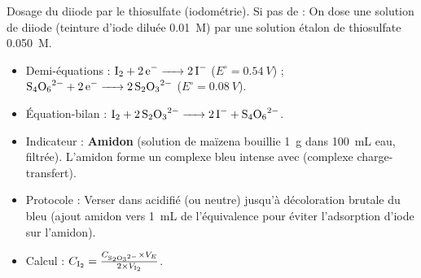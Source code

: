 \documentclass[11pt]{article}
\begin{document}
\begin{exoresolu}
Dosage du diiode par le thiosulfate (iodométrie).
\tcblower
Si pas de  : On dose une solution de diiode  (teinture d'iode diluée \SI{0,01}{M}) par une solution étalon de thiosulfate  \SI{0,050}{M}.
\begin{itemize}
    \item Demi-équations : $\ce{I2 + 2e- -> 2I-}$ ($E^\circ = \SI{+0,54}{V}$) ; $\ce{S4O6^2- + 2e- -> 2S2O3^2-}$ ($E^\circ = \SI{+0,08}{V}$).
    \item Équation-bilan : $\ce{I2 + 2 S2O3^2- -> 2 I- + S4O6^2-}$.
    \item Indicateur : \textbf{Amidon} (solution de maïzena bouillie \SI{1}{g} dans \SI{100}{mL} eau, filtrée). L'amidon forme un complexe bleu intense avec  (complexe charge-transfert).
    \item Protocole : Verser  dans  acidifié (ou neutre) jusqu'à décoloration brutale du bleu (ajout amidon vers \SI{1}{mL} de l'équivalence pour éviter l'adsorption d'iode sur l'amidon).
    \item Calcul : $C_{\ce{I2}} = \frac{C_{\ce{S2O3^2-}} \times V_E}{2 \times V_{\ce{I2}}}$.
\end{itemize}
\end{exoresolu}
\end{document}
